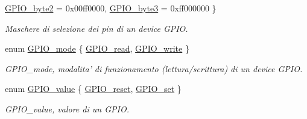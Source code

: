 \begin{DoxyCompactItemize}
\hyperlink{group___g_p_i_o_gga6d5aef8a8a54ee2f602d47252ff66595acf385bd78e3d36725f9d82955fce5fcf}{G\+P\+I\+O\+\_\+byte2} = 0x00ff0000, 
\hyperlink{group___g_p_i_o_gga6d5aef8a8a54ee2f602d47252ff66595adf78991a114e960df39d947c450de88c}{G\+P\+I\+O\+\_\+byte3} = 0xff000000
 \}
\begin{DoxyCompactList}\small\item\em Maschere di selezione dei pin di un device G\+P\+I\+O. \end{DoxyCompactList}\item 
enum \hyperlink{group___g_p_i_o_ga894e6ae857ed4a9aedd04fff44a6770e}{G\+P\+I\+O\+\_\+mode} \{ \hyperlink{group___g_p_i_o_gga894e6ae857ed4a9aedd04fff44a6770ea3db3c7d228d9b87cc125c8974241c800}{G\+P\+I\+O\+\_\+read}, 
\hyperlink{group___g_p_i_o_gga894e6ae857ed4a9aedd04fff44a6770eab1b932c1d800b09eb45b7ff5750bf73c}{G\+P\+I\+O\+\_\+write}
 \}
\begin{DoxyCompactList}\small\item\em G\+P\+I\+O\+\_\+mode, modalita' di funzionamento (lettura/scrittura) di un device G\+P\+I\+O. \end{DoxyCompactList}\item 
enum \hyperlink{group___g_p_i_o_ga495d9a7aa735fe416a3f110337c54967}{G\+P\+I\+O\+\_\+value} \{ \hyperlink{group___g_p_i_o_gga495d9a7aa735fe416a3f110337c54967a93cbe0e318453de590a9cb0030a840fa}{G\+P\+I\+O\+\_\+reset}, 
\hyperlink{group___g_p_i_o_gga495d9a7aa735fe416a3f110337c54967a39769e54aa8c4b6fbad0ef4ae88b5c44}{G\+P\+I\+O\+\_\+set}
 \}
\begin{DoxyCompactList}\small\item\em G\+P\+I\+O\+\_\+value, valore di un G\+P\+I\+O. \end{DoxyCompactList}\end{DoxyCompactItemize}

